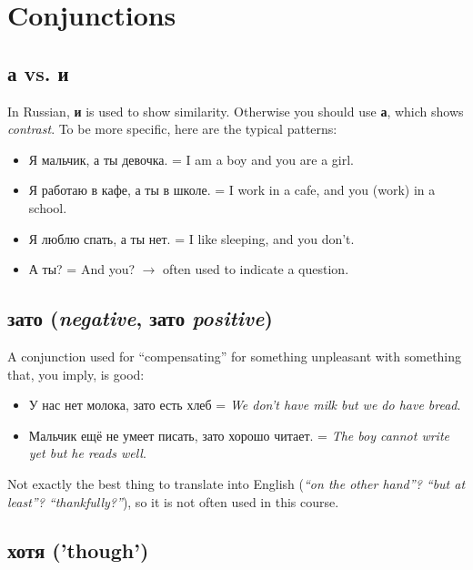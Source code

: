 \chapter{Conjunctions}\label{conjunctions}

\section{а vs. и}\label{ux430-vs.-ux438}

In Russian, \textbf{и} is used to show similarity. Otherwise you should
use \textbf{а}, which shows \emph{contrast}. To be more specific, here
are the typical patterns:

\begin{itemize}
\tightlist
\item
  Я мальчик, а ты девочка. = I am a boy and you are a girl.
\item
  Я работаю в кафе, а ты в школе. = I work in a cafe, and you (work) in
  a school.
\item
  Я люблю спать, а ты нет. = I like sleeping, and you don't.
\item
  А ты? = And you? $ \rightarrow$ often used to indicate a question.
\end{itemize}

\section{\texorpdfstring{зато (\emph{negative}, зато
\emph{positive})}{зато (negative, зато positive)}}\label{ux437ux430ux442ux43e-negative-ux437ux430ux442ux43e-positive}

A conjunction used for ``compensating'' for something unpleasant with
something that, you imply, is good:

\begin{itemize}
\tightlist
\item
  У нас нет молока, зато есть хлеб = \emph{We don't have milk but we do
  have bread}.
\item
  Мальчик ещё не умеет писать, зато хорошо читает. = \emph{The boy
  cannot write yet but he reads well}.
\end{itemize}

Not exactly the best thing to translate into English (\emph{``on the
other hand''? ``but at least''? ``thankfully?''}), so it is not often
used in this course.

\section{хотя ('though')}\label{ux445ux43eux442ux44f-though}

